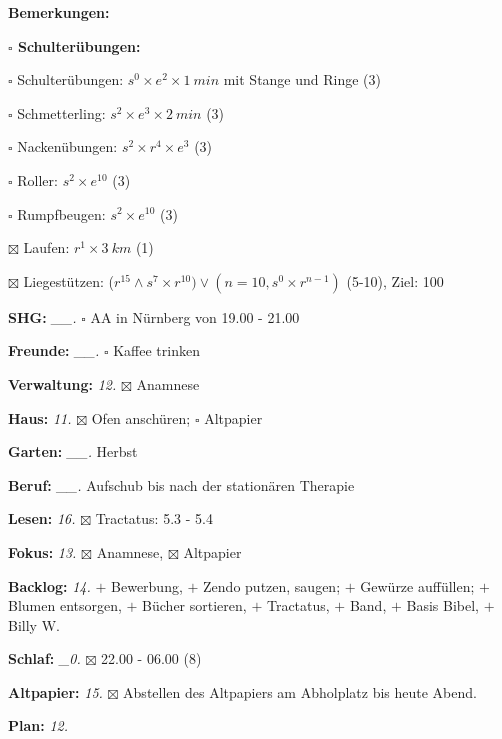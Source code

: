 \documentclass[10pt,a4paper]{article}
\newcommand\prop[1] {{\color {alizarin} {\bf #1}}}        %
\newcommand\opti[1] {{\color {amethyst} {\bf #1}}}        %
\newcommand\mand[1] {{\color {burntorange} {\bf #1}}}     %
\newcommand\topspace{\vskip -15pt \hskip 20pt}
\newcommand\bottomspace{\vskip 4pt}
\newcommand\n[1] { {\sl #1.} \hskip 5pt }
\begin{document}
\begin{mdframed}[style=daystyle]
\begin{labeling}{{\mand {Bemerkungen:}}}
\begin{minipage}{0.75\textwidth}
\begin{labeling}{\prop {$\square$ {Schulterübungen:}}}
        \setlength\itemsep{-3pt}
      \item[$\square$ Schulterübungen:] $s^0 \times e^2 \times 1\ min$ mit Stange und Ringe (3)
      \item[$\square$ Schmetterling:]   $s^2 \times e^3 \times 2\ min$ (3)
      \item[$\square$ Nackenübungen:]   $s^2 \times r^4 \times e^3$ (3)
      \item[$\square$ Roller:]          $s^2 \times e^{10}$ (3)
      \item[$\square$ Rumpfbeugen:]     $s^2 \times e^{10}$ (3)
      \item[$\boxtimes$ Laufen:]          $r^1 \times 3\ km$ (1)
      \item[$\boxtimes$ Liegestützen:]    ($r^{15} \land s^7 \times r^{10}) \vee (n=10, s^0 \times r^{n-1})$ (5-10), Ziel: 100
      \end{labeling}
    \end{minipage}
    \bottomspace        
  \item[{\mand {SHG:}}]          \n{\_\_} $\square$ AA in Nürnberg von 19.00 - 21.00
  \item[{\mand {Freunde:}}]      \n{\_\_} $\square$ Kaffee trinken
  \item[{\mand {Verwaltung:}}]     \n{12} $\boxtimes$ Anamnese
  \item[{\mand {Haus:}}]           \n{11} $\boxtimes$ Ofen anschüren; $\square$ Altpapier
  \item[{\mand {Garten:}}]       \n{\_\_} Herbst
  \item[{\mand {Beruf:}}]        \n{\_\_} Aufschub bis nach der stationären Therapie
  \item[{\mand {Lesen:}}]          \n{16} $\boxtimes$ Tractatus: 5.3 - 5.4
  \item[{\mand {Fokus:}}]          \n{13} $\boxtimes$ Anamnese, $\boxtimes$ Altpapier
  \item[{\mand {Backlog:}}]        \n{14} 
    $+$ Bewerbung,
    $+$ Zendo putzen, saugen; $+$ Gewürze auffüllen; $+$ Blumen entsorgen, $+$ Bücher sortieren,
    $+$ Tractatus, $+$ Band, $+$ Basis Bibel, $+$ Billy W.
  \item[{\mand {Schlaf:}}]        \n{\_0} $\boxtimes$ 22.00 - 06.00 (8)
  \item[{\opti {Altpapier:}}]      \n{15} $\boxtimes$ Abstellen des Altpapiers am Abholplatz bis heute Abend.
  \item[{\mand {Plan:}}]           \n{12}
    \topspace
    \begin{minipage}{0.75\textwidth}  

\end{minipage}
\end{labeling}
\end{mdframed}
\end{document}
